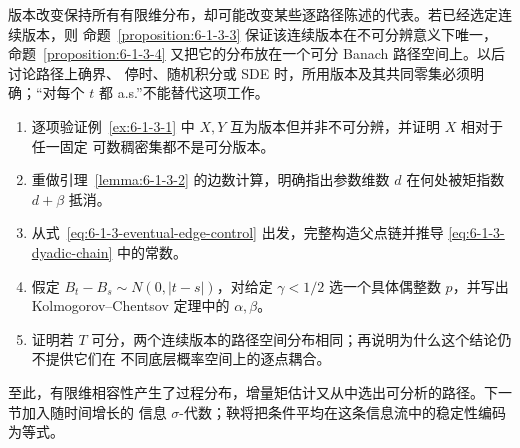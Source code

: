 \begin{remark}[版本、路径事件与分布]
版本改变保持所有有限维分布，却可能改变某些逐路径陈述的代表。若已经选定连续版本，则
命题~\ref{proposition:6-1-3-3} 保证该连续版本在不可分辨意义下唯一，
命题~\ref{proposition:6-1-3-4} 又把它的分布放在一个可分 Banach 路径空间上。以后讨论路径上确界、
停时、随机积分或 SDE 时，所用版本及其共同零集必须明确；“对每个 $t$ 都 a.s.”不能替代这项工作。
\end{remark}

\begin{exercise}
\begin{enumerate}
  \item 逐项验证例~\ref{ex:6-1-3-1} 中 $X,Y$ 互为版本但并非不可分辨，并证明 $X$ 相对于任一固定
        可数稠密集都不是可分版本。
  \item 重做引理~\ref{lemma:6-1-3-2} 的边数计算，明确指出参数维数 $d$ 在何处被矩指数
        $d+\beta$ 抵消。
  \item 从式~\eqref{eq:6-1-3-eventual-edge-control} 出发，完整构造父点链并推导
        \eqref{eq:6-1-3-dyadic-chain} 中的常数。
  \item 假定 $B_t-B_s\sim N(0,|t-s|)$，对给定 $\gamma<1/2$ 选一个具体偶整数 $p$，并写出
        Kolmogorov--Chentsov 定理中的 $\alpha,\beta$。
  \item 证明若 $T$ 可分，两个连续版本的路径空间分布相同；再说明为什么这个结论仍不提供它们在
        不同底层概率空间上的逐点耦合。
\end{enumerate}
\end{exercise}

至此，有限维相容性产生了过程分布，增量矩估计又从中选出可分析的路径。下一节加入随时间增长的
信息 $\sigma$-代数；鞅将把条件平均在这条信息流中的稳定性编码为等式。
